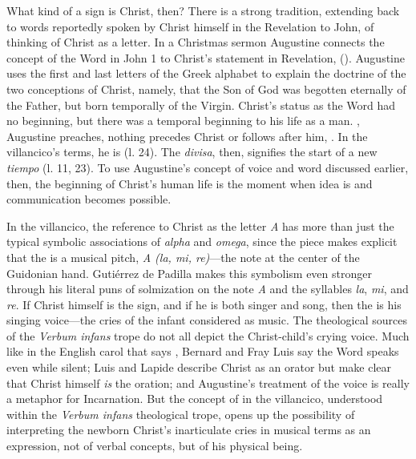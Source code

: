 What kind of a sign is Christ, then?
There is a strong tradition, extending back to words reportedly spoken by Christ
himself in the Revelation to John, of thinking of Christ as a letter.
In a Christmas sermon Augustine connects the concept of the Word in John 1 to
Christ's statement in Revelation,  ().
Augustine uses the first and last letters of the Greek alphabet to explain the
doctrine of the two conceptions of Christ, namely, that the Son of God was
begotten eternally of the Father, but born temporally of the Virgin.
Christ's status as the Word had no beginning, but there was a temporal beginning
to his life as a man.
, Augustine preaches,
nothing precedes Christ or follows after him, .%
    \Autocites
    [, 118r, In Natali Domini 2]
    {Augustine:Opera1555}
    [on Rv 1]{Lapide:Apocalypse1627}
In the villancico's terms, he is  (l. 24).
The \emph{divisa}, then, signifies the start of a new \emph{tiempo} (l.  11,
23).
To use Augustine's concept of voice and word discussed earlier, then, the
beginning of Christ's human life is the moment when idea is  and communication becomes possible.

In the villancico, the reference to Christ as the letter \emph{A} has more than
just the typical symbolic associations of \emph{alpha} and \emph{omega}, since
the piece makes explicit that the  is a musical pitch, \emph{A (la,
mi, re)}---the note at the center of the Guidonian hand.
Gutiérrez de Padilla makes this symbolism even stronger through his literal puns
of solmization on the note \emph{A} and the syllables \emph{la}, \emph{mi}, and
\emph{re}.
If Christ himself is the sign, and if he is both singer and song, then the
 is his singing voice---the cries of the infant considered as
music.
The theological sources of the \emph{Verbum infans} trope do not all depict the
Christ-child's crying voice.
Much like in the English carol that says , Bernard and Fray Luis say the Word speaks even while silent; Luis and
Lapide describe Christ as an orator but make clear that Christ himself \emph{is}
the oration; and Augustine's treatment of the voice is really a metaphor for
Incarnation.
But the concept of  in the villancico, understood within
the \emph{Verbum infans} theological trope, opens up the possibility of
interpreting the newborn Christ's inarticulate cries in musical terms as an
expression, not of verbal concepts, but of his physical being.

